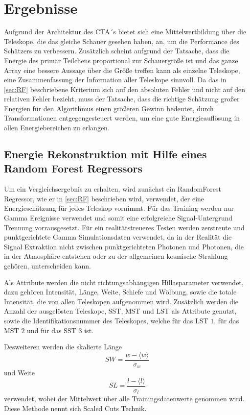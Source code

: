 \chapter{Ergebnisse}
Aufgrund der Architektur des CTA´s bietet sich eine Mittelwertbildung über die Teleskope, die das gleiche Schauer gesehen
haben, an, um die Performance des Schätzers zu verbessern.
Zusätzlich scheint aufgrund der Tatsache, dass die Energie des primär Teilchens proportional zur Schauergröße ist und das
ganze Array eine bessere Aussage über die Größe treffen kann als einzelne Teleskope, eine Zusammenfassung der
Information aller Teleskope sinnvoll.
Da das in \autoref{sec:RF} beschriebene Kriterium sich auf den absoluten Fehler und nicht auf den relativen Fehler
bezieht, muss der Tatsache, dass die richtige Schätzung großer Energien für den Algorithmus einen größeren Gewinn bedeutet,
durch Transformationen entgegengesteuert werden, um eine gute Energieauflösung in allen Energiebereichen zu erlangen.

\section{Energie Rekonstruktion mit Hilfe eines Random Forest Regressors}
\label{sec:first}

Um ein Vergleichsergebnis zu erhalten, wird zunächst ein RandomForest Regressor, wie er in \autoref{sec:RF} beschrieben wird, verwendet,
der eine Energieschätzung für jedes Teleskop vornimmt.
Für das Training werden nur Gamma Ereignisse verwendet und somit eine erfolgreiche Signal-Untergrund Trennung vorrausgesetzt.
Für ein realitätstreueres Testen werden zerstreute und punktgerichtete Gamma Simulationsdaten verwendet, da in der
Realität die Signal Extraktion nicht zwischen punktgerichteten Photonen und Photonen, die in der Atmosphäre entstehen oder zu der
allgemeinen kosmische Strahlung gehören, unterscheiden kann.

Als Attribute werden die nicht richtungsabhängigen Hillasparameter verwendet, dazu gehören Intensität, Länge, Weite, Schiefe und Wölbung, sowie
die totale Intensität, die von allen Teleskopen aufgenommen wird.
Zusätzlich werden die Anzahl der ausgelösten Teleskope, SST, MST und LST als Attribute genutzt, sowie die Identifikationsnummer des
Teleskopes, welche für das LST $1$, für das MST $2$ und für das SST $3$ ist.

Desweiteren werden die skalierte Länge
\begin{equation}
  SW = \frac{w- \langle w \rangle}{\sigma_w}
\end{equation}
und Weite
\begin{equation}
  SL = \frac{l - \langle l \rangle}{\sigma_l}
\end{equation}
verwendet, wobei der Mittelwert über alle Trainingsdatenwerte genommen wird. Diese Methode nennt sich Scaled Cuts Technik.\cite[104]{HESS}

